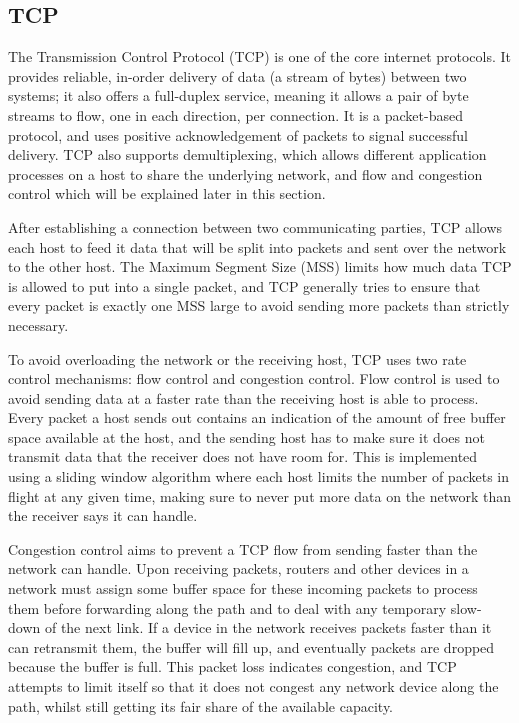 \subsection{TCP}
The Transmission Control Protocol (TCP) is one of the core internet protocols.
It provides reliable, in-order delivery of data (a stream of bytes) between two
systems; it also offers a full-duplex service, meaning it allows a pair of byte
streams to flow, one in each direction, per connection. It is a packet-based
protocol, and uses positive acknowledgement of packets to signal successful
delivery. TCP also supports demultiplexing, which allows different application
processes on a host to share the underlying network, and flow and congestion
control which will be explained later in this section.

After establishing a connection between two communicating parties, TCP allows
each host to feed it data that will be split into packets and sent over the
network to the other host. The Maximum Segment Size (MSS) limits how much data
TCP is allowed to put into a single packet, and TCP generally tries to ensure
that every packet is exactly one MSS large to avoid sending more packets than
strictly necessary.

To avoid overloading the network or the receiving host, TCP uses two rate
control mechanisms: flow control and congestion control. Flow control is used to
avoid sending data at a faster rate than the receiving host is able to process.
Every packet a host sends out contains an indication of the amount of free
buffer space available at the host, and the sending host has to make sure it
does not transmit data that the receiver does not have room for. This is
implemented using a sliding window algorithm where each host limits the number
of packets in flight at any given time, making sure to never put more data on
the network than the receiver says it can handle.

Congestion control aims to prevent a TCP flow from sending faster than the
network can handle. Upon receiving packets, routers and other devices in a
network must assign some buffer space for these incoming packets to process them
before forwarding along the path and to deal with any temporary slow-down of the
next link. If a device in the network receives packets faster than it can
retransmit them, the buffer will fill up, and eventually packets are dropped
because the buffer is full. This packet loss indicates congestion, and TCP
attempts to limit itself so that it does not congest any network device along
the path, whilst still getting its fair share of the available capacity.

